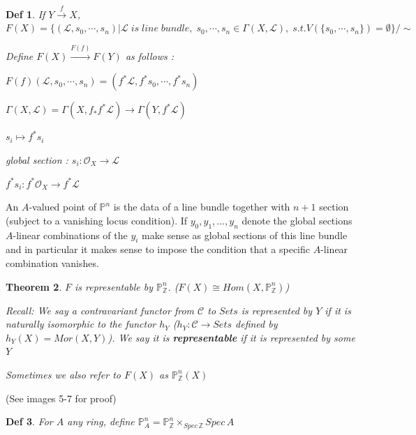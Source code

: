 \documentclass{article}
\newtheorem{theorem}{Theorem}[section]
\newtheorem{definition}[theorem]{Def}
\begin{document}
\begin{definition}
    If $Y\xrightarrow{f}X$, $F(X)=\{(\mathcal L,s_0,\cdots,s_n)|\mathcal L\;is\;line\;bundle,\;s_0,\cdots,s_n\in\Gamma(X,\mathcal L),\;s.t.V(\{s_0,\cdots,s_n\})=\emptyset\}/\sim$
    
    Define $F(X)\xrightarrow{F(f)}F(Y)$ as follows :

    $F(f)(\mathcal L,s_0,\cdots,s_n)=(f^\ast\mathcal L,f^\ast s_0,\cdots,f^\ast s_n)$

    $\Gamma(X,\mathcal L)=\Gamma(X,f_\ast f^\ast\mathcal L)\to\Gamma(Y,f^\ast\mathcal L)$

    $s_i\mapsto f^\ast s_i$

    global section : $s_i:\mathcal O_X\to \mathcal L$

    $f^\ast s_i: f^\ast\mathcal O_X\to f^\ast\mathcal L$
\end{definition}

An $A$-valued point of $\mathbb P^n$ is the data of a line bundle together with $n+1$ section (subject to a vanishing locus condition). If $y_0, y_1,...,y_n$ denote the global sections $A$-linear combinations of the $y_i$ make sense as global sections of this line bundle and in particular it makes sense to impose the condition that a specific $A$-linear combination vanishes.

\begin{theorem}
    $F$ is representable by $\mathbb P^n_{\mathbb Z}$. ($F(X)\cong Hom(X,\mathbb P^n_{\mathbb Z})$)

    Recall: We say a contravariant functor from $\mathcal C$ to
$Sets$ is represented by $Y$ if it is naturally isomorphic to the functor $h_Y$ ($h_Y :\mathcal C \to Sets$ defined by
$h_Y(X) = Mor(X, Y)$). We say it is
\textbf{representable} if it is represented by some $Y$

Sometimes we also refer to $F(X)$ as $\mathbb P^n_{\mathbb Z}(X)$
\end{theorem}

(See images 5-7 for proof)

\begin{definition}
    For $A$ any ring, define $\mathbb P_{A}^n=\mathbb P_{\mathbb Z}^n\times_{Spec\,\mathbb Z}Spec\,A$
\end{definition}
\end{document}
